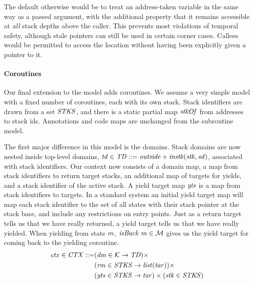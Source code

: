 \documentclass[10pt,conference]{ieeetran}%
\theoremstyle{definition}
\begin{document}
{The default otherwise would be to treat an address-taken variable in the
same way as a passed argument, with the additional property
that it remains accessible at \emph{all} stack depths above the caller.
This prevents most violations of temporal safety, although stale pointers
can still be used in certain corner cases. Callees would be permitted
to access the location without having been explicitly given a pointer
to it.

\medskip

\paragraph*{Coroutines}

Our final extension to the model adds coroutines. We assume a very simple model with
a fixed number of coroutines, each with its own stack.
Stack identifiers are drawn from a set \(\mathit{STKS}\), and there is a static partial map
\(\mathit{stkOf}\) from addresses to stack ids.  Annotations and code maps are unchanged from
the subroutine model.

The first major difference in this model is the domains. Stack domains are now nested inside
top-level domains, \(\mathit{td} \in \mathit{TD} ::= \mathit{outside} + \mathit{instk}(\mathit{stk},\mathit{sd})\),
associated with stack identifiers.
Our context now consists of a domain map, a map from stack identifiers to return target stacks,
an additional map of targets for yields, and a stack identifier of the active stack.
A yield target map \(\mathit{yts}\) is a map from stack identifiers to targets.
In a standard system an initial yield target map will map each stack identifier to the
set of all states with their stack pointer at the stack base, and include any restrictions
on entry points. Just as a return target tells us that we have really returned, a yield
target tells us that we have really yielded. When yielding from state \(m\),
\(\mathit{isBack} ~ m \in {\mathcal M}\) gives us the yield target for coming back to the yielding
coroutine.
%
\[\begin{split}
\mathit{ctx} \in \mathit{CTX} ::= & (\mathit{dm} \in {\mathcal K} \rightarrow \mathit{TD}) \times \\
& (\mathit{rm} \in \mathit{STKS} \rightarrow \mathit{list}(\mathit{tar})) \times \\
& (\mathit{yts} \in \mathit{STKS} \rightarrow \mathit{tar}) \times (\mathit{stk} \in \mathit{STKS})
\end{split}\]

}
\end{document}
